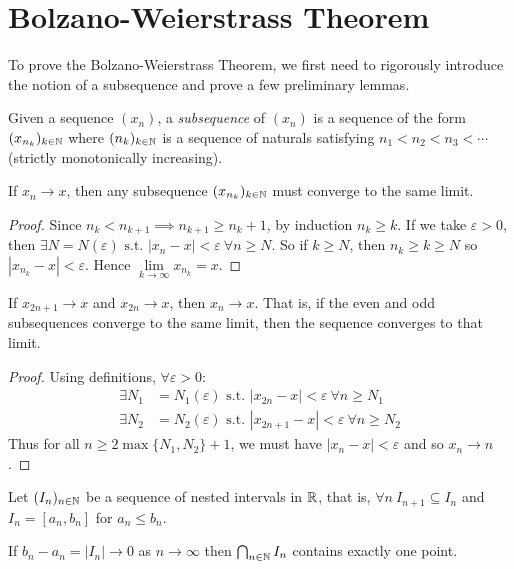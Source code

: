 \documentclass[../main.tex]{subfiles}
\begin{document}
\section{Bolzano-Weierstrass Theorem}
To prove the Bolzano-Weierstrass Theorem, we first need to rigorously introduce the notion of a subsequence and prove a few preliminary lemmas.
\begin{definition}[Subsequence]
  Given a sequence $(x_n)$, a \textit{subsequence} of $(x_n)$ is a sequence of the form $(x_{n_k})_{k \in \mathbb{N}}$ where $(n_k)_{k \in \mathbb{N}}$ is a sequence of naturals satisfying $n_1 < n_2 < n_3 < \cdots$ (strictly monotonically increasing).
\end{definition}
\begin{lemma}
  If $x_n \to x$, then any subsequence $(x_{n_k})_{k \in \mathbb{N}}$ must converge to the same limit.
  \label{subseqenceConvergence}
\end{lemma}
\begin{proof}
  Since $n_k < n_{k + 1} \implies n_{k + 1} \geq n_k + 1$, by induction $n_k \geq k$.
  If we take $\varepsilon > 0$, then $\exists N = N (\varepsilon) \text{ s.t. } |x_n - x| < \varepsilon\ \forall n \geq N$.
  So if $k \geq N$, then $n_k \geq k \geq N$ so $|x_{n_k} - x| < \varepsilon$.
  Hence $\lim\limits_{k \to \infty} x_{n_k} = x$.
\end{proof}
\begin{lemma}
  If $x_{2n + 1} \to x$ and $x_{2n} \to x$, then $x_n \to x$.
  That is, if the even and odd subsequences converge to the same limit, then the sequence converges to that limit.
  \label{evenOddSubseq}
\end{lemma}
\begin{proof}
  Using definitions, $\forall \varepsilon > 0$:
  \begin{align*}
    \exists N_1 &= N_1(\varepsilon) \text{ s.t. } |x_{2n} - x| < \varepsilon\ \forall n \geq N_1 \\
    \exists N_2 &= N_2(\varepsilon) \text{ s.t. } |x_{2n + 1} - x| < \varepsilon\ \forall n \geq N_2
  \end{align*}
  Thus for all $n \geq 2\max\{N_1, N_2\} + 1$, we must have $|x_n - x| < \varepsilon$ and so $x_n \to n$.
\end{proof}
\begin{proposition}
  Let $(I_n)_{n \in \mathbb{N}}$ be a sequence of nested intervals in $\mathbb{R}$, that is, $\forall n\ I_{n + 1} \subseteq I_n$ and $I_n = [a_n, b_n]$ for $a_n \leq b_n$.
  \label{nestedInterval}

  If $b_n - a_n = |I_n| \to 0$ as $n \to \infty$ then $\bigcap_{n \in \mathbb{N}} I_n$ contains exactly one point.
\end{proposition}
\end{document}
